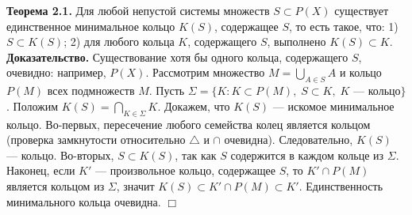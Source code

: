 \documentclass[12pt]{article}
\begin{document}
\textbf{Теорема 2.1.} Для любой непустой системы множеств $S \subset P(X)$ существует единственное минимальное кольцо $K(S)$, содержащее $S$, то есть такое, что: 1) $S \subset K(S)$; 2) для любого кольца $K$, содержащего $S$, выполнено $K(S) \subset K$. \\\textbf{Доказательство.} Существование хотя бы одного кольца, содержащего $S$, очевидно: например, $P(X)$. Рассмотрим множество $M = \bigcup_{A \in S} A$ и кольцо $P(M)$ всех подмножеств $M$. Пусть $\Sigma = \{ K : K \subset P(M), \; S \subset K, \; K \text{ — кольцо} \}$. Положим $K(S) = \bigcap_{K \in \Sigma} K$. Докажем, что $K(S)$ — искомое минимальное кольцо. Во-первых, пересечение любого семейства колец является кольцом (проверка замкнутости относительно $\triangle$ и $\cap$ очевидна). Следовательно, $K(S)$ — кольцо. Во-вторых, $S \subset K(S)$, так как $S$ содержится в каждом кольце из $\Sigma$. Наконец, если $K'$ — произвольное кольцо, содержащее $S$, то $K' \cap P(M)$ является кольцом из $\Sigma$, значит $K(S) \subset K' \cap P(M) \subset K'$. Единственность минимального кольца очевидна. \hfill $\Box$

\end{document}
